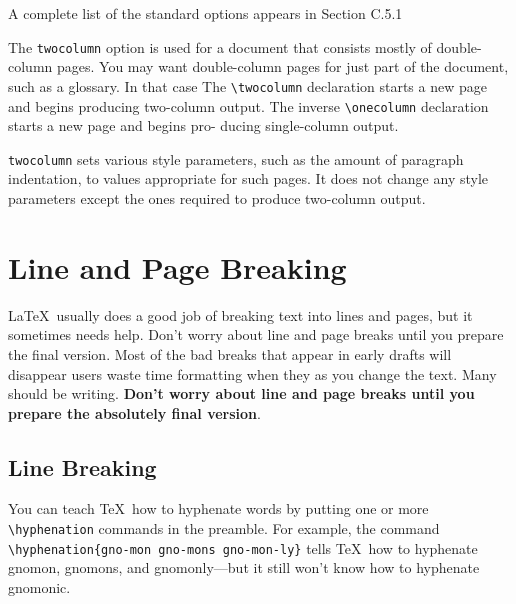 \documentclass{article}
\newcommand{\justtext}[1]{\texttt{\textbackslash #1}}
\begin{document}
A complete list of the standard options appears in Section C.5.1 %

The {\tt twocolumn} option is used for a document that consists mostly of double-column pages. You
may want double-column pages for just part of the document, such as a glossary. In that case
The \justtext{twocolumn} declaration starts a new page and begins producing two-column output. The
inverse \justtext{onecolumn} declaration starts a new page and begins pro- ducing single-column
output.

{\tt twocolumn} sets various style parameters, such as the amount of paragraph indentation, to
values appropriate for such pages. It does not change any style parameters except the ones required
to produce two-column output.



\section{Line and Page Breaking}

\LaTeX\ usually does a good job of breaking text into lines and pages, but it sometimes needs help.
Don't worry about line and page breaks until you prepare the final version. Most of the bad breaks
that appear in early drafts will disappear users waste time formatting when they as you change the
text. Many should be writing. 
\textbf{Don't worry about line and page breaks until you prepare the absolutely final version}.

\subsection{Line Breaking}\label{sub-line-break}


You can teach \TeX\ how to hyphenate words by putting one or more \justtext{hyphenation} commands in
the preamble. For example, the command \justtext{hyphenation\{gno-mon gno-mons gno-mon-ly\}}
tells \TeX\ how to hyphenate gnomon, gnomons, and gnomonly---but it still won't
know how to hyphenate gnomonic.
\end{document}

